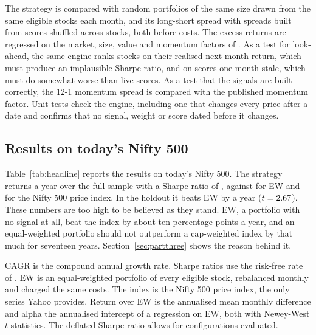 \documentclass[11pt]{article}
\begin{document}
The strategy is compared with \NRandom{} random portfolios of the same size drawn from
the same eligible stocks each month, and its long-short spread with \NPlacebo{}
spreads built from scores shuffled across stocks, both before costs. The excess
returns are regressed on the market, size, value and momentum factors of
\citet{agarwalla2013}. As a test for
look-ahead, the same engine ranks stocks on their realised next-month return, which
must produce an implausible Sharpe ratio, and on scores one month stale, which must
do somewhat worse than live scores. As a test that the signals are built correctly,
the 12-1 momentum spread is compared with the published momentum factor. Unit tests
check the engine, including one that changes every price after a date and confirms
that no signal, weight or score dated before it changes.

\subsection{Results on today's Nifty 500}

Table~\ref{tab:headline} reports the results on today's Nifty 500. The
strategy returns \SurvCagrFull{} a year over the full sample with a Sharpe ratio of
\SurvSharpeFull, against \SurvEwCagrFull{} for EW and \SurvNiftyCagrFull{} for the
Nifty 500 price index. In the holdout it beats EW by \SurvActiveHold{} a year
($t = 2.67$). These numbers are too high to be believed as they stand.
EW, a portfolio with no signal at all, beat the index by about ten percentage points
a year, and an equal-weighted portfolio should not outperform a cap-weighted index by
that much for seventeen years. Section~\ref{sec:partthree} shows the reason behind it.

\begin{table}[!htbp]
\centering
\caption{The strategy on today's Nifty 500, net of costs}
\label{tab:headline}
\small

\begin{tablenote}
CAGR is the compound annual growth rate. Sharpe ratios use the risk-free rate of
\citet{agarwalla2013}. EW is an equal-weighted portfolio of every eligible stock,
rebalanced monthly and charged the same costs. The index is the Nifty 500 price
index, the only series Yahoo provides. Return over EW is the annualised mean monthly
difference and alpha the annualised intercept of a regression on EW, both with
Newey-West $t$-statistics. The deflated Sharpe ratio allows for \NTrials{}
configurations evaluated.
\end{tablenote}
\end{table}
\end{document}
